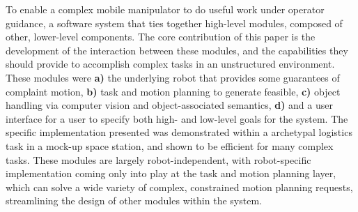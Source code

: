 To enable a complex mobile manipulator to do useful work under operator guidance, a software system that ties together high-level modules, composed of other, lower-level components.
The core contribution of this paper is the development of the interaction between these modules, and the capabilities they should provide to accomplish complex tasks in an unstructured environment.
These modules were 
  \textbf{a)} the underlying robot that provides some guarantees of complaint motion,
  \textbf{b)} task and motion planning to generate feasible,
  \textbf{c)} object handling via computer vision and object-associated semantics,
  \textbf{d)} and a user interface for a user to specify both high- and low-level goals for the system.
The specific implementation presented was demonstrated within a archetypal logistics task in a mock-up space station, and shown to be efficient for many complex tasks.
These modules are largely robot-independent, with robot-specific implementation coming only into play at the task and motion planning layer, which can solve a wide variety of complex, constrained motion planning requests, streamlining the design of other modules within the system.

